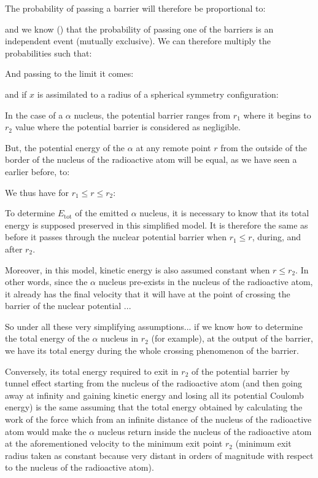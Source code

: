 	The probability of passing a barrier will therefore be proportional to:
	
	and we know () that the probability of passing one of the barriers is an independent event (mutually exclusive). We can therefore multiply the probabilities such that:
	
	And passing to the limit it comes:
	
	and if $x$ is assimilated to a radius of a spherical symmetry configuration:
	
	In the case of a $\alpha$ nucleus, the potential barrier ranges from $r_1$ where it begins to $r_2$ value where the potential barrier is considered as negligible.

	But, the potential energy of the $\alpha$ at any remote point $r$ from the outside of the border of the nucleus of the radioactive atom will be equal, as we have seen a earlier before, to:
	
	We thus have for $r_1\leq r \leq r_2$:
	
	To determine $E_\text{tot}$ of the emitted $\alpha$ nucleus, it is necessary to know that its total energy is supposed preserved in this simplified model. It is therefore the same as before it passes through the nuclear potential barrier when $r_1\leq r$, during, and after $r_2$.

	Moreover, in this model, kinetic energy is also assumed constant when $r\leq r_2$. In other words, since the $\alpha$ nucleus pre-exists in the nucleus of the radioactive atom, it already has the final velocity that it will have at the point of crossing the barrier of the nuclear potential ...

	So under all these very simplifying assumptions... if we know how to determine the total energy of the $\alpha$ nucleus in $r_2$ (for example), at the output of the barrier, we have its total energy during the whole crossing phenomenon of the barrier.

	Conversely, its total energy required to exit in $r_2$ of the potential barrier by tunnel effect starting from the nucleus of the radioactive atom (and then going away at infinity and gaining kinetic energy and losing all its potential Coulomb energy) is the same assuming that the total energy obtained by calculating the work of the force which from an infinite distance of the nucleus of the radioactive atom would make the $\alpha$ nucleus return inside the nucleus of the radioactive atom at the aforementioned velocity to the minimum exit point $r_2$ (minimum exit radius taken as constant because very distant in orders of magnitude with respect to the nucleus of the radioactive atom).

